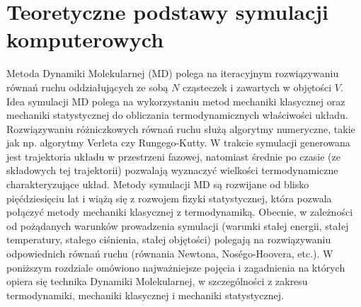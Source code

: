 \documentclass[12pt,a4paper,openright]{report} %
\begin{document}
%
\tableofcontents
%

\chapter{Teoretyczne podstawy symulacji komputerowych}
Metoda Dynamiki Molekularnej (MD) polega na iteracyjnym rozwiązywaniu równań ruchu oddziałujących ze sobą $N$ cząsteczek i zawartych w objętości $V$. Idea symulacji MD polega na wykorzystaniu metod mechaniki klasycznej oraz mechaniki statystycznej do obliczania termodynamicznych właściwości układu. Rozwiązywaniu różniczkowych równań ruchu służą algorytmy numeryczne, takie jak np. algorytmy Verleta czy Rungego-Kutty. W trakcie symulacji generowana jest trajektoria układu w przestrzeni fazowej, natomiast średnie po czasie (ze składowych tej trajektorii) pozwalają wyznaczyć wielkości termodynamiczne charakteryzujące układ.  Metody symulacji MD są rozwijane od blisko pięćdziesięciu lat i wiążą się z rozwojem fizyki statystycznej, która pozwala połączyć metody mechaniki klasycznej z termodynamiką. Obecnie, w zależności od pożądanych warunków prowadzenia symulacji (warunki stałej energii, stałej temperatury, stałego ciśnienia, stałej objętości) polegają na rozwiązywaniu odpowiednich równań ruchu (równania Newtona, Noségo-Hoovera, etc.). W poniższym rozdziale omówiono najważniejsze pojęcia i zagadnienia na których opiera się technika Dynamiki Molekularnej, w szczególności z zakresu termodynamiki, mechaniki klasycznej i mechaniki statystycznej.
\end{document}
